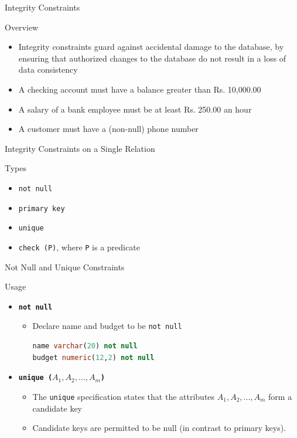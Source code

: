 \documentclass[aspectratio=169, xcolor=dvipsnames]{beamer}
\begin{document}
\begin{frame}{Integrity Constraints}
    \begin{block}{Overview}
        \begin{itemize}[<+->]
            \item Integrity constraints guard against accidental damage to the database, by ensuring that authorized changes to the database do not result in a loss of data consistency
            \item A checking account must have a balance greater than Rs. 10,000.00
            \item A salary of a bank employee must be at least Rs. 250.00 an hour
            \item A customer must have a (non-null) phone number
        \end{itemize}
    \end{block}
\end{frame}

\begin{frame}{Integrity Constraints on a Single Relation}
    \begin{block}{Types}
        \begin{itemize}[<+->]
            \item \texttt{not null}
            \item \texttt{primary key}
            \item \texttt{unique}
            \item \texttt{check (P)}, where \texttt{P} is a predicate
        \end{itemize}
    \end{block}
\end{frame}

\begin{frame}[fragile]{Not Null and Unique Constraints}
    \begin{block}{Usage}
        \begin{itemize}[<+->]
            \item \textbf{\texttt{not null}}
            \begin{itemize}
                \item[$\triangleright$] Declare name and budget to be \texttt{not null}
                \begin{lstlisting}[language=SQL]
name varchar(20) not null 
budget numeric(12,2) not null
                \end{lstlisting}
            \end{itemize}
            \item \textbf{\texttt{unique ($A_1, A_2, ..., A_m$)}}
            \begin{itemize}
                \item[$\triangleright$] The \texttt{unique} specification states that the attributes $A_1, A_2, ..., A_m$ form a candidate key
                \item[$\triangleright$] Candidate keys are permitted to be null (in contrast to primary keys).
            \end{itemize}
        \end{itemize}
    \end{block}
\end{frame}
\end{document}
